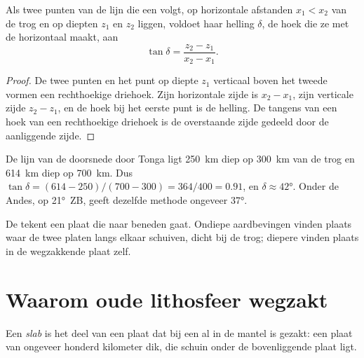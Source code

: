 \begin{proposition}\label{prop:g11:subduction-zones:dip}
Als twee punten van de lijn die een  volgt, op
horizontale afstanden $x_1 < x_2$ van de trog en op diepten $z_1$ en $z_2$ liggen,
voldoet haar helling $\delta$, de hoek die ze met de horizontaal maakt, aan
\[
  \tan \delta = \frac{z_2 - z_1}{x_2 - x_1}.
\]
\end{proposition}

\begin{proof}
De twee punten en het punt op diepte $z_1$ verticaal boven het tweede
vormen een rechthoekige driehoek. Zijn horizontale zijde is $x_2 - x_1$, zijn verticale zijde
$z_2 - z_1$, en de hoek bij het eerste punt is de helling. De tangens van een
hoek van een rechthoekige driehoek is de overstaande zijde gedeeld door de aanliggende zijde.
\end{proof}

\begin{example}\label{ex:g11:subduction-zones:dip}
De lijn van de doorsnede door Tonga ligt \qty{250}{km} diep op \qty{300}{km} van
de trog en \qty{614}{km} diep op \qty{700}{km}. Dus
$\tan\delta = (614 - 250)/(700 - 300) = 364/400 = 0.91$, en
$\delta \approx \ang{42}$. Onder de Andes, op \ang{21}~ZB, geeft dezelfde
methode ongeveer \ang{37}.
\end{example}

De  tekent een plaat die naar beneden gaat. Ondiepe aardbevingen
vinden plaats waar de twee platen langs elkaar schuiven, dicht bij de trog; diepere
vinden plaats in de wegzakkende plaat zelf.

\section{Waarom oude lithosfeer wegzakt}

\begin{definition}[Slab]\label{def:g11:subduction-zones:slab}
Een \emph{slab} is het deel van een plaat dat bij een  al in
de mantel is gezakt: een plaat  van ongeveer
honderd kilometer dik, die schuin onder de bovenliggende plaat ligt.
\end{definition}

